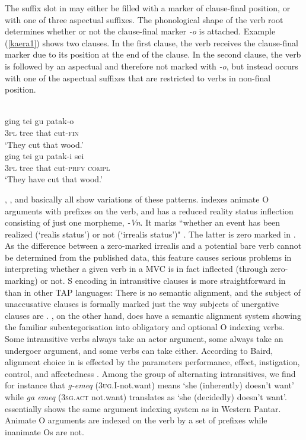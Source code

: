 The suffix slot in  may either be filled with a marker of clause-final position, or with one of three aspectual suffixes. The phonological shape of the verb root determines whether or not the clause-final marker \textit{-o} is attached. Example (\ref{kaera1}) shows two clauses. In the first clause, the verb receives the clause-final marker due to its position at the end of the clause. In the second clause, the verb is followed by an aspectual and therefore not marked with \textit{-o}, but instead occurs with one of the aspectual suffixes that are restricted to verbs in non-final position.

\ea \label{kaera1}
 \\
\ea
\gll ging tei gu patak-o \\
\textsc{3}\textsc{pl} tree that cut-\textsc{fin} \\
\glft `They cut that wood.' \\ 
\ex
\gll ging tei gu patak-i sei \\ 
\textsc{3}\textsc{pl} tree that cut-\textsc{prfv} \textsc{compl} \\
\glft `They have cut that wood.'\\ 
\z
\z

, , and  basically all show variations of these patterns.  indexes animate O arguments with prefixes on the verb, and has a reduced reality status inflection consisting of just one morpheme, \textit{-Vn}. It marks ``whether an event has been realized (`realis status') or not (`irrealis status')" \citep[245]{klamer2010grammar}. The latter is zero marked in . As the difference between a zero-marked irrealis and a potential bare verb cannot be determined from the published data, this feature causes serious problems in interpreting whether a given verb in a MVC is in fact inflected (through zero-marking) or not. S encoding in intransitive clauses is more straightforward in  than in other TAP languages: There is no semantic alignment, and the subject of unaccusative clauses is formally marked just the way subjects of unergative clauses are \citep[169]{klamer2010grammar}. , on the other hand, does have a semantic alignment system showing the familiar subcategorisation into obligatory and optional O indexing verbs. Some intransitive verbs always take an actor argument, some always take an undergoer argument, and some verbs can take either. According to Baird, alignment choice in  is effected by the parameters performance, effect, instigation, control, and affectedness \citep[52]{baird2008grammar}. Among the group of alternating intransitives, we find for instance that \textit{g-emeq} (\textsc{3ug.I}-not.want) means `she (inherently) doesn't want' while \textit{ga emeq} (\textsc{3sg.act} not.want) translates as `she (decidedly) doesn't want'.  essentially shows the same argument indexing system as in Western Pantar. Animate O arguments are indexed on the verb by a set of prefixes while inanimate Os are not. 

